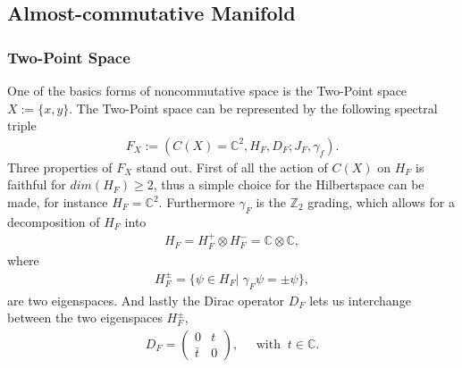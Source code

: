\subsection{Almost-commutative Manifold\label{sec:4}}
\subsubsection{Two-Point Space}
One of the basics forms of noncommutative space is the Two-Point space $X
:= \{x, y\}$. The Two-Point space can be represented by the following spectral triple
\begin{align}
    F_X := (C(X) = \mathbb{C}^2, H_F, D_F; J_F, \gamma _f).
\end{align}
Three properties of $F_X$ stand out. First of all the action of $C(X)$ on
$H_F$ is faithful for $dim(H_F) \geq 2$, thus a simple choice for the
Hilbertspace can be made, for instance $H_F = \mathbb{C}^2$. Furthermore
$\gamma_F$ is the $\mathbb{Z}_2$ grading, which allows for a decomposition of
$H_F$ into
\begin{align}
   H_F = H_F^+ \otimes H_F^- = \mathbb{C} \otimes \mathbb{C},
\end{align}
where
\begin{align}
    H_F^\pm = \{\psi \in H_F |\; \gamma_F\psi = \pm \psi\},
\end{align}
are two eigenspaces. And lastly the Dirac operator $D_F$ lets us
interchange between the two eigenspaces $H_F^\pm$,
\begin{align}
    D_F =
        \begin{pmatrix}0 & t \\ \bar{t} & 0\end{pmatrix},  \;\;\;\;\;
            \text{with} \;\; t\in\mathbb{C}.
\end{align}

